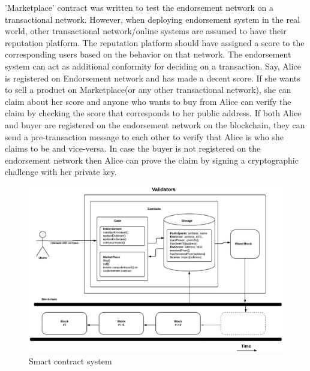 'Marketplace' contract was written to test the endorsement network on a
transactional network. However, when deploying endorsement system in the real
world, other transactional network/online systems are assumed to have their
reputation platform. The reputation platform should have assigned a score to
the corresponding users based on the behavior on that network. The endorsement
system can act as additional conformity for deciding on a transaction. Say,
Alice is registered on Endorsement network and has made a decent score. If she
wants to sell a product on Marketplace(or any other transactional network), she
can claim about her score and anyone who wants to buy from Alice can verify the
claim by checking the score that corresponds to her public address. If both
Alice and buyer are registered on the endorsement network on the blockchain,
they can send a pre-transaction message to each other to verify that Alice is
who she claims to be and vice-versa. In case the buyer is not registered on the
endorsement network then Alice can prove the claim by signing a cryptographic
challenge with her private key. 

\begin{figure}
	\centering
	\includegraphics[width=1.0\textwidth]{Images/SmartContractsEDSMarketPlace.eps}
	\caption{Smart contract system}
	\label{fig:smartcontracts}
\end{figure}


